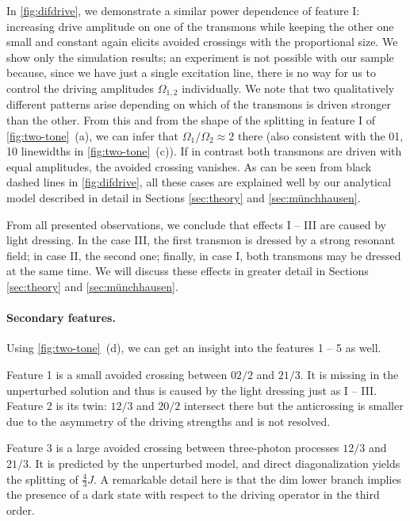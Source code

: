 \documentclass[%
 aps, prx,
 amsmath,amssymb,
 reprint,%
superscriptaddress
]{revtex4-2}
\begin{document}
In \autoref{fig:difdrive}, we demonstrate a similar power dependence of feature I: increasing drive amplitude on one of the 
transmons while keeping the other one small and 
constant again elicits avoided crossings with the 
proportional size. We  show only the simulation results; an experiment is not possible with our sample because, since we have just a single excitation line, there is 
no way for us to control the driving amplitudes 
$\Omega_{1,2}$ individually. We note that two 
qualitatively different patterns arise depending 
on which of the transmons is driven stronger than 
the other. From this and from the shape of the 
splitting in feature I of 
\autoref{fig:two-tone}~(a), we can infer that 
$\Omega_1/\Omega_2 \approx 2$ there (also 
consistent with the 01, 10 linewidths in 
\autoref{fig:two-tone}~(c)). If in contrast both transmons are driven with equal amplitudes, the avoided crossing vanishes. As can be seen from black dashed lines in \autoref{fig:difdrive}, all these cases are explained well by our analytical model described in detail in Sections \ref{sec:theory} and \ref{sec:münchhausen}.

From all presented observations, we conclude that effects I -- III 
are caused by light dressing. In the case III, the 
first transmon is dressed by a strong resonant 
field; in case II, the second one; finally, in 
case I, both transmons may be dressed at the same 
time. We will discuss these effects in greater 
detail in Sections \ref{sec:theory} and \ref{sec:münchhausen}.

\paragraph{Secondary features.} Using 
\autoref{fig:two-tone}~(d), we can get an insight 
into the features 1 -- 5 as well. 

Feature 1 is a small avoided crossing between 
${02/2}$ and ${21/3}$. It is missing in the 
unperturbed solution and thus is caused by the 
light dressing just as I -- III. Feature 2 is its 
twin: ${12/3}$ and ${20/2}$ intersect there but 
the anticrossing is smaller due to the asymmetry 
of the driving strengths and is not resolved. 

Feature 3 is a large avoided crossing between 
three-photon processes ${12/3}$ and ${21/3}$. It 
is predicted by the unperturbed model, and direct 
diagonalization yields the splitting of 
$\frac{4}{3}J$. A remarkable detail here is that 
the dim lower branch implies the presence of a 
dark state with respect to the driving operator 
in the third order. 
\end{document}
